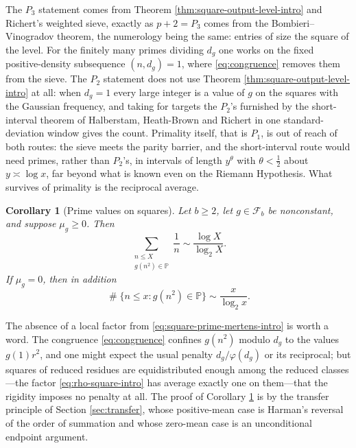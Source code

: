 \documentclass[11pt,reqno]{amsart}
\theoremstyle{plain}
\newtheorem{corollary}[theorem]{Corollary}
\theoremstyle{definition}
\newcommand{\Pp}{\mathbb{P}}
\newcommand{\1}{\mathbf 1}
\DeclareMathOperator{\Card}{\#}
\begin{document}
The $P_3$ statement comes from Theorem \ref{thm:square-output-level-intro} and Richert's weighted sieve, exactly as $p+2=P_3$ comes from the Bombieri--Vinogradov theorem, the numerology being the same: entries of size the square of the level. For the finitely many primes dividing $d_g$ one works on the fixed positive-density subsequence $(n,d_g)=1$, where \eqref{eq:congruence} removes them from the sieve. The $P_2$ statement does not use Theorem \ref{thm:square-output-level-intro} at all: when $d_g=1$ every large integer is a value of $g$ on the squares with the Gaussian frequency, and taking for targets the $P_2$'s furnished by the short-interval theorem of Halberstam, Heath-Brown and Richert \cite{hhbr} in one standard-deviation window gives the count. Primality itself, that is $P_1$, is out of reach of both routes: the sieve meets the parity barrier, and the short-interval route would need primes, rather than $P_2$'s, in intervals of length $y^\theta$ with $\theta<\tfrac12$ about $y\asymp\log x$, far beyond what is known even on the Riemann Hypothesis. What survives of primality is the reciprocal average.

\begin{corollary}[Prime values on squares]\label{cor:square-prime-values}
Let $b\ge2$, let $g\in\mathcal F_b$ be nonconstant, and suppose $\mu_g\ge0$.  Then
\begin{equation}\label{eq:square-prime-mertens-intro}
 \sum_{\substack{n\le X\\ g(n^2)\in\Pp}}\frac1n
 \sim\frac{\log X}{\log_2X}.
\end{equation}
If $\mu_g=0$, then in addition
\begin{equation}\label{eq:square-prime-count-intro}
 \Card\{n\le x:g(n^2)\in\Pp\}
 \sim\frac{x}{\log_2x}.
\end{equation}
\end{corollary}

The absence of a local factor from \eqref{eq:square-prime-mertens-intro} is worth a word. The congruence \eqref{eq:congruence} confines $g(n^2)$ modulo $d_g$ to the values $g(1)r^2$, and one might expect the usual penalty $d_g/\varphi(d_g)$ or its reciprocal; but squares of reduced residues are equidistributed enough among the reduced classes---the factor \eqref{eq:rho-square-intro} has average exactly one on them---that the rigidity imposes no penalty at all. The proof of Corollary \ref{cor:square-prime-values} is by the transfer principle of Section \ref{sec:transfer}, whose positive-mean case is Harman's reversal of the order of summation and whose zero-mean case is an unconditional endpoint argument.
\end{document}

